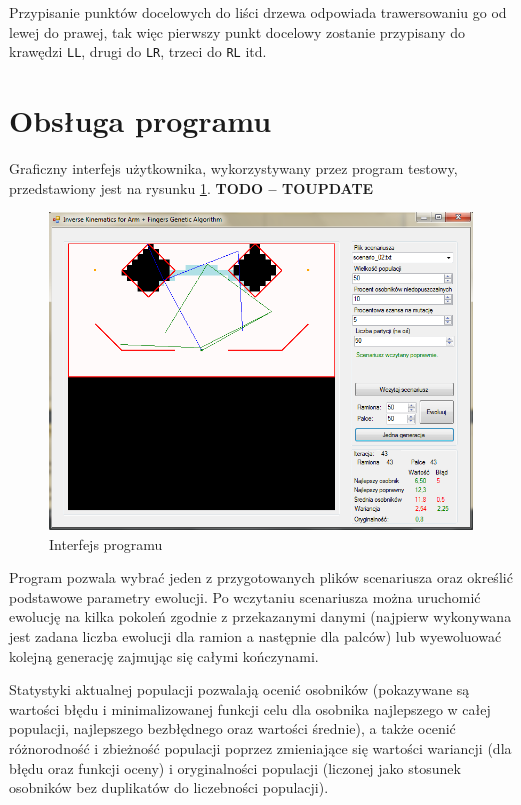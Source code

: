 \documentclass[11pt, leqno]{article}
\begin{document}
Przypisanie punktów docelowych do liści drzewa odpowiada trawersowaniu go od lewej do prawej, tak więc pierwszy punkt docelowy zostanie przypisany do krawędzi \texttt{LL}, drugi do \texttt{LR}, trzeci do \texttt{RL} itd.

\section{Obsługa programu}
Graficzny interfejs użytkownika, wykorzystywany przez program testowy, przedstawiony jest na rysunku \ref{fig:gui}.
\textbf{TODO -- TOUPDATE}
\begin{figure}[h!]
	\centering
	\includegraphics[scale=0.5]{gui}
	\caption{Interfejs programu}
	\label{fig:gui}
\end{figure}

Program pozwala wybrać jeden z przygotowanych plików scenariusza oraz określić podstawowe parametry ewolucji. Po wczytaniu scenariusza można uruchomić ewolucję na kilka pokoleń zgodnie z przekazanymi danymi (najpierw wykonywana jest zadana liczba ewolucji dla ramion a następnie dla palców) lub wyewoluować kolejną generację zajmując się całymi kończynami.

Statystyki aktualnej populacji pozwalają ocenić osobników (pokazywane są wartości błędu i minimalizowanej funkcji celu dla osobnika najlepszego w całej populacji, najlepszego bezbłędnego oraz wartości średnie), a także ocenić różnorodność i zbieżność populacji poprzez zmieniające się wartości wariancji (dla błędu oraz funkcji oceny) i oryginalności populacji (liczonej jako stosunek osobników bez duplikatów do liczebności populacji).
\end{document}
